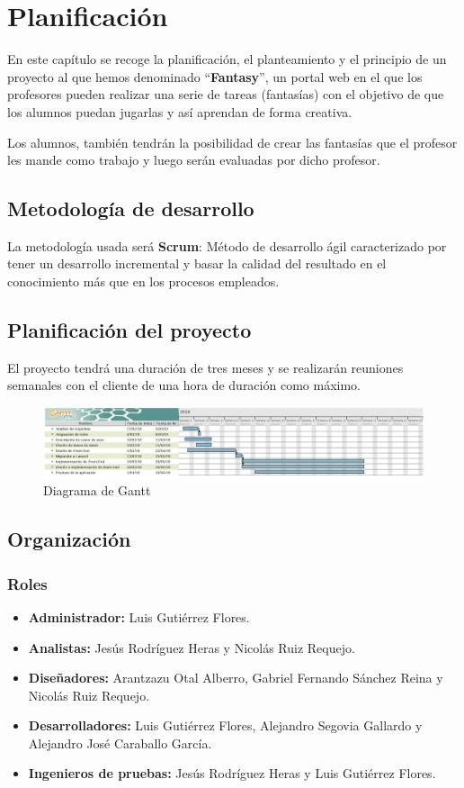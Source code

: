 \chapter{Planificación}
En este capítulo se recoge la planificación, el planteamiento y el principio de un proyecto al que hemos denominado ``\textbf{Fantasy}'', un portal web en el que los profesores pueden realizar una serie de tareas (fantasías) con el objetivo de que los alumnos puedan jugarlas y así aprendan de forma creativa.

Los alumnos, también tendrán la posibilidad de crear las fantasías que el profesor les mande como trabajo y luego serán evaluadas por dicho profesor.

\section{Metodología de desarrollo}
La metodología usada será \textbf{Scrum}: Método de desarrollo ágil caracterizado por tener un desarrollo incremental y basar la calidad del resultado en el conocimiento más que en los procesos empleados.

\section{Planificación del proyecto}
El proyecto tendrá una duración de tres meses y se realizarán reuniones semanales con el cliente de una hora de duración como máximo.
\begin{figure}[h]
	\centering
	\includegraphics[scale=0.85]{Gantt.pdf}
	\caption{Diagrama de Gantt}
	\label{Diagrama de Gantt}
\end{figure}

\section{Organización}
\subsection{Roles}
\begin{itemize}
	\item \textbf{Administrador:} Luis Gutiérrez Flores.
	\item \textbf{Analistas:} Jesús Rodríguez Heras y Nicolás Ruiz Requejo.
	\item \textbf{Diseñadores:} Arantzazu Otal Alberro, Gabriel Fernando Sánchez Reina y Nicolás Ruiz Requejo.
	\item \textbf{Desarrolladores:} Luis Gutiérrez Flores, Alejandro Segovia Gallardo y Alejandro José Caraballo García.
	\item \textbf{Ingenieros de pruebas:} Jesús Rodríguez Heras y Luis Gutiérrez Flores.
\end{itemize}

